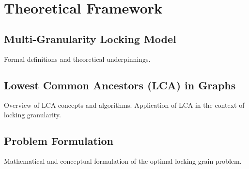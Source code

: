 \chapter{Theoretical Framework}
\section{Multi-Granularity Locking Model}
Formal definitions and theoretical underpinnings.

\section{Lowest Common Ancestors (LCA) in Graphs}
Overview of LCA concepts and algorithms. Application of LCA in the context of locking granularity.

\section{Problem Formulation}
Mathematical and conceptual formulation of the optimal locking grain problem.
